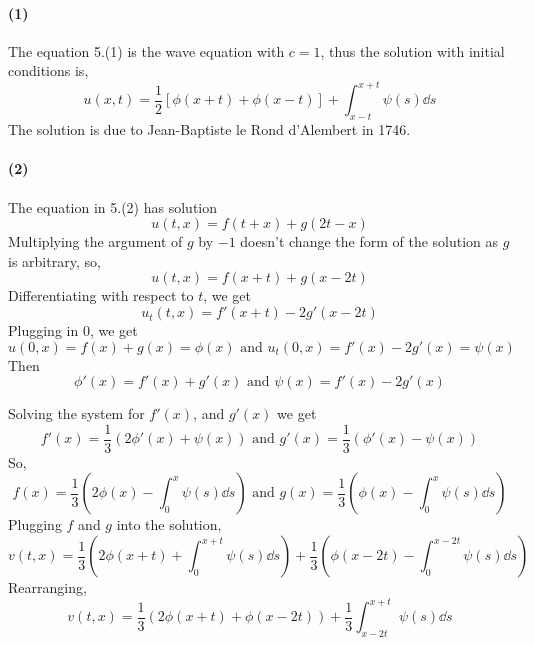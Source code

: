 \documentclass{article}
\begin{document}
\paragraph{(1)} The equation 5.(1) is the wave equation with $c = 1$, thus
the solution with initial conditions is, \[u(x,t) =
  \frac{1}{2}[\phi(x+t)+\phi(x-t)] + \int_{x-t}^{x+t} \psi(s)
  \dd{s}\]
The solution is due to Jean-Baptiste le Rond d'Alembert in 1746.
\newpage
\paragraph{(2)} The equation in 5.(2) has solution
\[u(t,x) =  f(t+x)+g(2t-x)\]
Multiplying the argument of $g$ by $-1$ doesn't change the form of the
solution as $g$ is arbitrary, so,
\[u(t,x) =  f(x+t)+g(x-2t)\]
Differentiating with respect to $t$, we get
\[u_t(t,x) =  f'(x+t)-2g'(x-2t)\]
Plugging in $0$, we get
\[u(0,x) =  f(x)+g(x) = \phi(x) \text{ and } u_t(0,x) =
  f'(x)-2g'(x) = \psi(x)\]
Then
\[\phi'(x) = f'(x)+g'(x) \text{ and } \psi(x) = f'(x)-2g'(x)\]

Solving the system for $f'(x)$, and $g'(x)$ we get
\[f'(x) = \frac{1}{3}(2\phi'(x) + \psi(x)) \text{ and } g'(x) = \frac{1}{3}(\phi'(x) -\psi(x))\]
So,
\[f(x) = \frac{1}{3}\left(  2\phi(x) -\int_0^x\psi(s) \dd{s}\right) \text{ and } g(x) =\frac{1}{3}\left(
  \phi(x) -\int_0^x \psi(s) \dd{s}\right)\]
Plugging $f$ and $g$ into the solution,
\[v(t,x) = \frac{1}{3}\left(  2\phi(x+t) +\int_0^{x+t}\psi(s) \dd{s}\right) +\frac{1}{3}\left(
    \phi(x-2t) -\int_0^{x-2t} \psi(s) \dd{s}\right)\]
Rearranging,
\[v(t,x) = \frac{1}{3}(2\phi(x+t) +\phi(x-2t)) +\frac{1}{3} \int_{x-2t}^{x+t}\psi(s)
  \dd{s}\]
\end{document}
